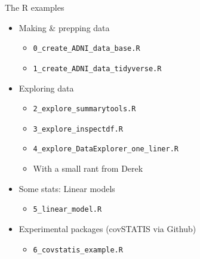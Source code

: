 \documentclass[ignorenonframetext,]{beamer}
\providecommand{\tightlist}{%
  \setlength{\itemsep}{0pt}\setlength{\parskip}{0pt}}
\begin{document}
\begin{frame}[fragile]{The R examples}
\protect\hypertarget{the-r-examples}{}

\begin{itemize}
\tightlist
\item
  Making \& prepping data

  \begin{itemize}
  \tightlist
  \item
    \texttt{0\_create\_ADNI\_data\_base.R}
  \item
    \texttt{1\_create\_ADNI\_data\_tidyverse.R}
  \end{itemize}
\item
  Exploring data

  \begin{itemize}
  \tightlist
  \item
    \texttt{2\_explore\_summarytools.R}
  \item
    \texttt{3\_explore\_inspectdf.R}
  \item
    \texttt{4\_explore\_DataExplorer\_one\_liner.R}
  \item
    With a small rant from Derek
  \end{itemize}
\item
  Some stats: Linear models

  \begin{itemize}
  \tightlist
  \item
    \texttt{5\_linear\_model.R}
  \end{itemize}
\item
  Experimental packages (covSTATIS via Github)

  \begin{itemize}
  \tightlist
  \item
    \texttt{6\_covstatis\_example.R}
  \end{itemize}
\end{itemize}

\end{frame}
\end{document}
